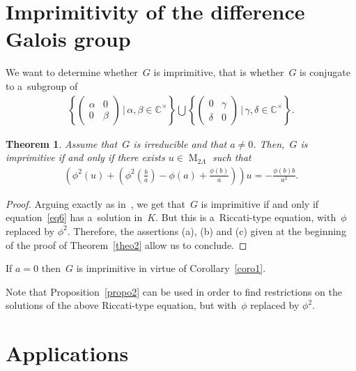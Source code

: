 \documentclass[pdftex]{sigma}
\numberwithin{equation}{section}
\newtheorem{Theorem}{Theorem}[section]
\begin{document}
\section{Imprimitivity of the dif\/ference Galois group}
\label{sec5}

We want to determine whether~$G$ is imprimitive, that is whether~$G$ is conjugate to a~subgroup of
\begin{gather*}
\left\{
\begin{pmatrix}
\alpha&0
\\
0&\beta
\end{pmatrix}
\, \vert \, \alpha, \beta \in \mathbb C^{\times} \right\} \bigcup \left\{
\begin{pmatrix}
0&\gamma
\\
\delta &0
\end{pmatrix}
\, \vert \, \gamma, \delta \in \mathbb C^{\times} \right\}.
\end{gather*}

\begin{Theorem}
\label{riccati et imprimitivite}
Assume that~$G$ is irreducible and that $a\neq 0$.
Then,~$G$ is imprimitive if and only if there exists $u\in \operatorname{M}_{2\Lambda}$ such that
\begin{gather}
\label{eq6}
\left(\phi^{2}(u)+\left(\phi^{2}\left(\frac{b}{a}\right)-\phi(a)+\frac{\phi(b)}{a} \right)\right)
u=-\frac{\phi(b)b}{a^{2}}.
\end{gather}
\end{Theorem}

\begin{proof}
Arguing exactly as in~\cite[Theorem 4.6]{Hen98}, we get that~$G$ is imprimitive if and only if equation~\eqref{eq6} has
a~solution in~$K$.
But this is a~Riccati-type equation, with~$\phi$ replaced by $\phi^{2}$.
Therefore, the assertions (a), (b) and (c) given at the beginning of the proof of Theorem~\ref{theo2} allow us to
conclude.
\end{proof}

\begin{Remark}
If $a=0$ then~$G$ is imprimitive in virtue of Corollary~\ref{coro1}.
\end{Remark}

Note that Proposition~\ref{propo2} can be used in order to f\/ind restrictions on the solutions of the above Riccati-type
equation, but with~$\phi$ replaced by $\phi^{2}$.

\section{Applications}
\label{sec6}
\end{document}
